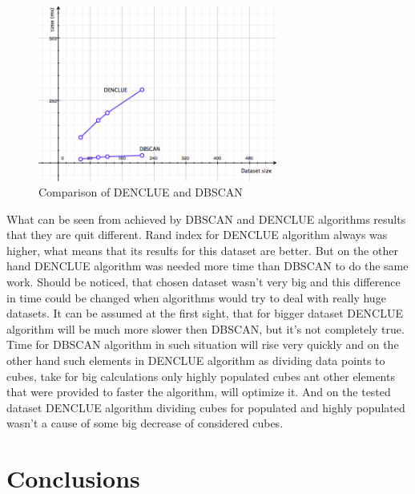 \documentclass[12pt, a4paper, notitlepage, oneside]{article}
\begin{document}
\begin{figure}[!ht]
 	\centering
	\includegraphics[width=0.7\textwidth]{images/comparison_time.png}
 	\caption[]
	{Comparison of DENCLUE and DBSCAN}
		\label{comparison_time}
\end{figure}

What can be seen from achieved by DBSCAN and DENCLUE algorithms results that they are quit different. 
Rand index for DENCLUE algorithm always was higher, what means that its results for this dataset are better. 
But on the other hand DENCLUE  algorithm was needed  more time than DBSCAN to do the same work. 
Should be noticed, that chosen dataset wasn't very big and this difference in time could be changed when 
algorithms would try to deal with really huge datasets. It can be assumed at the first sight, that for bigger 
dataset DENCLUE algorithm will be much more slower then DBSCAN, but it's not completely true. 
Time for DBSCAN algorithm in such situation will rise very quickly and on the other hand such elements in 
DENCLUE algorithm as dividing data points to cubes, take for big calculations only highly populated cubes ant other elements that were provided to faster the algorithm, will optimize it. And on the tested dataset DENCLUE algorithm dividing cubes for populated and highly populated wasn't a cause of some big decrease of considered cubes. 

\cleardoublepage

\section{Conclusions}

\newpage



\end{document}
